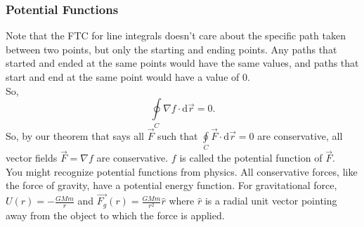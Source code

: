 \subsubsection{Potential Functions}
\noindent
Note that the FTC for line integrals doesn't care about the specific path taken between two points, but only the starting and ending points. Any paths that started and ended at the same points would have the same values, and paths that start and end at the same point would have a value of 0.\\
So, 
\begin{equation*}
	\oint\limits_{C}{\nabla f \cdot \mathrm{d}\vec{r}} = 0.
\end{equation*}
So, by our theorem that says all $\vec{F}$ such that $\oint\limits_{C}{\vec{F} \cdot \mathrm{d}\vec{r}} = 0$ are conservative, all vector fields $\vec{F} = \nabla f$ are conservative. $f$ is called the potential function of $\vec{F}$.\\

\noindent
You might recognize potential functions from physics. All conservative forces, like the force of gravity, have a potential energy function. For gravitational force, $U(r) = -\frac{GMm}{r}$ and $\vec{F_g}(r) = \frac{GMm}{r^2}\hat{r}$ where $\hat{r}$ is a radial unit vector pointing away from the object to which the force is applied.